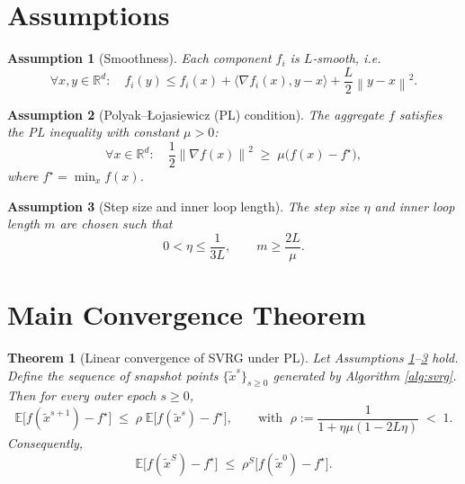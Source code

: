 \documentclass{article}
\newcommand{\E}{\mathbb{E}}
\newcommand{\R}{\mathbb{R}}
\newcommand{\norm}[1]{\left\lVert#1\right\rVert}
\newtheorem{theorem}{Theorem}
\newtheorem{assumption}{Assumption}
\begin{document}
\section*{Assumptions}
\begin{assumption}[Smoothness]\label{ass:smooth}
Each component $f_i$ is $L$‑smooth, i.e.
\[
\forall x,y\in\R^{d}:\quad
f_i(y)\le f_i(x)+\langle\nabla f_i(x),y-x\rangle+\frac{L}{2}\norm{y-x}^{2}.
\]
\end{assumption}
\begin{assumption}[Polyak–Łojasiewicz (PL) condition]\label{ass:pl}
The aggregate $f$ satisfies the PL inequality with constant $\mu>0$:
\[
\forall x\in\R^{d}:\quad
\frac{1}{2}\norm{\nabla f(x)}^{2}\;\ge\;\mu\bigl(f(x)-f^{\star}\bigr),
\]
where $f^{\star}=\min_{x}f(x)$.
\end{assumption}
\begin{assumption}[Step size and inner loop length]\label{ass:params}
The step size $\eta$ and inner loop length $m$ are chosen such that
\[
0<\eta\le\frac{1}{3L},\qquad 
m\ge \frac{2L}{\mu}.
\]
\end{assumption}

\section*{Main Convergence Theorem}
\begin{theorem}[Linear convergence of SVRG under PL]\label{thm:linear}
Let Assumptions \ref{ass:smooth}–\ref{ass:params} hold. Define the sequence of snapshot points $\{\tilde{x}^{s}\}_{s\ge0}$ generated by Algorithm \ref{alg:svrg}. Then for every outer epoch $s\ge0$,
\[
\E\!\bigl[f(\tilde{x}^{s+1})-f^{\star}\bigr]\;\le\;
\rho\;\E\!\bigl[f(\tilde{x}^{s})-f^{\star}\bigr],
\qquad\text{with }\;
\rho:=\frac{1}{1+\eta\mu(1-2L\eta)}\;<\;1.
\]
Consequently,
\[
\E\!\bigl[f(\tilde{x}^{S})-f^{\star}\bigr]\;\le\;
\rho^{S}\bigl[f(\tilde{x}^{0})-f^{\star}\bigr].
\]
\end{theorem}
\end{document}
